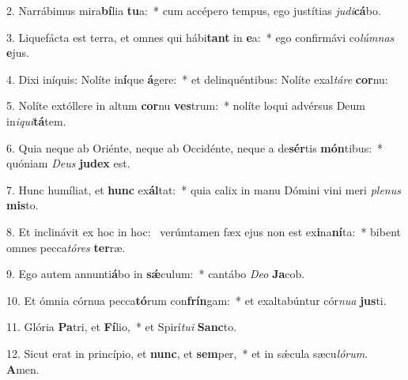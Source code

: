 2. Narrábimus mira\textbf{bí}lia \textbf{tu}a:~*  cum accépero tempus, ego justítias \textit{ju}\textit{di}\textbf{cá}bo.\

3. Liquefácta est terra, et omnes qui hábi\textbf{tant} in \textbf{e}a:~*  ego confirmávi co\textit{lúm}\textit{nas} \textbf{e}jus.\

4. Dixi iníquis: Nolíte in\textbf{í}que \textbf{á}gere:~*  et delinquéntibus: Nolíte exal\textit{tá}\textit{re} \textbf{cor}nu:\

5. Nolíte extóllere in altum \textbf{cor}nu \textbf{ves}trum:~*  nolíte loqui advérsus Deum in\textit{i}\textit{qui}\textbf{tá}tem.\

6. Quia neque ab Oriénte, neque ab Occidénte, neque a de\textbf{sér}tis \textbf{món}tibus:~*  quóniam \textit{De}\textit{us} \textbf{ju}\textbf{dex} est.\

7. Hunc humíliat, et \textbf{hunc} ex\textbf{ál}tat:~*  quia calix in manu Dómini vini meri \textit{ple}\textit{nus} \textbf{mis}to.\

8. Et inclinávit ex hoc in hoc: \dag\  verúmtamen fæx ejus non est ex\textbf{i}na\textbf{ní}ta:~*  bibent omnes pecca\textit{tó}\textit{res} \textbf{ter}ræ.\

9. Ego autem annunti\textbf{á}bo in \textbf{sǽ}culum:~*  cantábo \textit{De}\textit{o} \textbf{Ja}cob.\

10. Et ómnia córnua pecca\textbf{tó}rum con\textbf{frín}gam:~*  et exaltabúntur cór\textit{nu}\textit{a} \textbf{jus}ti.\

11. Glória \textbf{Pa}tri, et \textbf{Fí}lio,~*  et Spirí\textit{tu}\textit{i} \textbf{Sanc}to.\

12. Sicut erat in princípio, et \textbf{nunc}, et \textbf{sem}per,~*  et in sǽcula sæcu\textit{ló}\textit{rum}. \textbf{A}men.\

